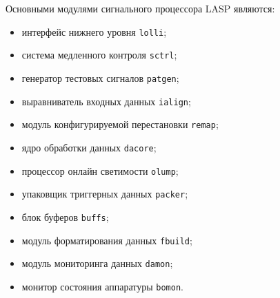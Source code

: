Основными модулями сигнального процессора LASP являются:\par
\begin{itemize}
    \item интерфейс нижнего уровня \texttt{lolli};
    \item система медленного контроля \texttt{sctrl};
    \item генератор тестовых сигналов \texttt{patgen};
    \item выравниватель входных данных \texttt{ialign};
    \item модуль конфигурируемой перестановки \texttt{remap};
    \item ядро обработки данных \texttt{dacore};
    \item процессор онлайн светимости \texttt{olump};
    \item упаковщик триггерных данных \texttt{packer};
    \item блок буферов \texttt{buffs};
    \item модуль форматирования данных \texttt{fbuild};
    \item модуль мониторинга данных \texttt{damon};
    \item монитор состояния аппаратуры \texttt{bomon}.
\end{itemize}\par

